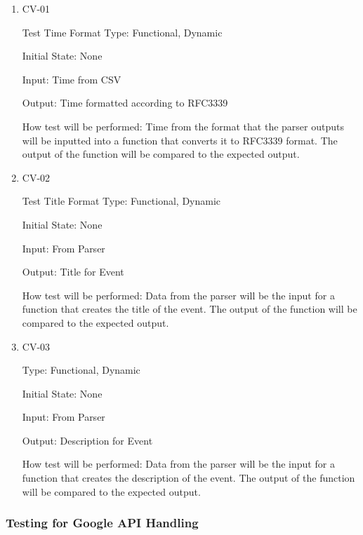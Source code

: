 \documentclass[12pt, titlepage]{article}
\begin{document}
\begin{enumerate}

\item{CV-01\\}

Test Time Format
Type: Functional, Dynamic
					
Initial State: None
					
Input: Time from CSV
					
Output: Time formatted according to RFC3339
					
How test will be performed: 
Time from the format that the parser outputs will be inputted into a function that converts it to RFC3339 format. The output of the function will be compared to the expected output. 

\item{CV-02\\}

Test Title Format
Type: Functional, Dynamic
					
Initial State: None
					
Input: From Parser
					
Output: Title for Event
					
How test will be performed: 
Data from the parser will be the input for a function that creates the title of the event. 
The output of the function will be compared to the expected output.

\item{CV-03\\}

Type: Functional, Dynamic
					
Initial State: None
					
Input: From Parser
					
Output: Description for Event
					
How test will be performed: 
Data from the parser will be the input for a function that creates the description of the event. 
The output of the function will be compared to the expected output.
\end{enumerate}


\subsubsection{Testing for Google API Handling}
\end{document}
